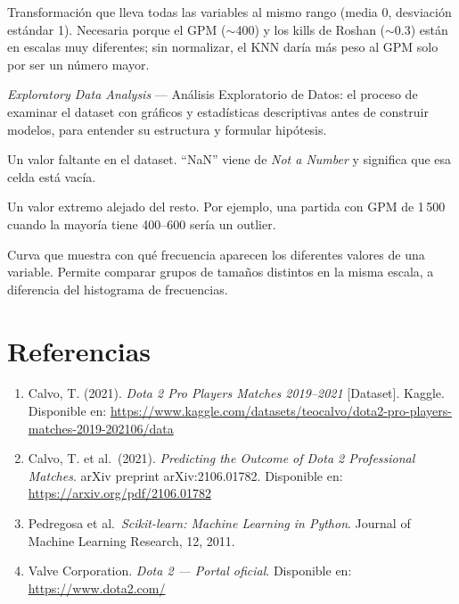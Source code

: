 \documentclass[12pt,a4paper]{article}
\begin{document}
\begin{description}[leftmargin=4.2cm, style=nextline, itemsep=5pt]
  \item[StandardScaler] Transformaci\'on que lleva todas las variables al mismo
    rango (media 0, desviaci\'on est\'andar 1). Necesaria porque el GPM ($\sim$400)
    y los kills de Roshan ($\sim$0.3) est\'an en escalas muy diferentes; sin
    normalizar, el KNN dar\'ia m\'as peso al GPM solo por ser un n\'umero mayor.

  \item[EDA] \textit{Exploratory Data Analysis} --- An\'alisis Exploratorio de
    Datos: el proceso de examinar el dataset con gr\'aficos y estad\'isticas
    descriptivas antes de construir modelos, para entender su estructura y
    formular hip\'otesis.

  \item[Valor nulo / NaN] Un valor faltante en el dataset. ``NaN'' viene de
    \textit{Not a Number} y significa que esa celda est\'a vac\'ia.

  \item[Outlier] Un valor extremo alejado del resto. Por ejemplo, una partida
    con GPM de 1\,500 cuando la mayor\'ia tiene 400--600 ser\'ia un outlier.

  \item[Distribuci\'on de densidad] Curva que muestra con qu\'e frecuencia aparecen
    los diferentes valores de una variable. Permite comparar grupos de tama\~nos
    distintos en la misma escala, a diferencia del histograma de frecuencias.

\end{description}

\newpage
\section*{Referencias}

\begin{enumerate}
  \item\label{ref:kaggle} Calvo, T. (2021). \textit{Dota 2 Pro Players Matches
        2019--2021} [Dataset]. Kaggle.
        Disponible en: \url{https://www.kaggle.com/datasets/teocalvo/dota2-pro-players-matches-2019-202106/data}
  \item\label{ref:paper} Calvo, T. et al.\ (2021). \textit{Predicting the Outcome
        of Dota 2 Professional Matches}. arXiv preprint arXiv:2106.01782.
        Disponible en: \url{https://arxiv.org/pdf/2106.01782}
  \item\label{ref:sklearn} Pedregosa et al.\ \textit{Scikit-learn: Machine
        Learning in Python}. Journal of Machine Learning Research, 12, 2011.
  \item\label{ref:valve} Valve Corporation. \textit{Dota 2 --- Portal oficial}.
        Disponible en: \url{https://www.dota2.com/}
\end{enumerate}
\end{document}
